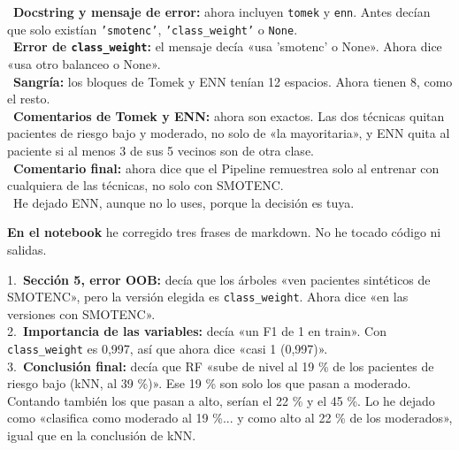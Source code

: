 \documentclass[11pt,a4paper]{article}
\begin{document}
{\hspace*{1.0em}\textbullet~\textbf{Docstring y mensaje de error:} ahora incluyen \texttt{\textquotedbl{}tomek\textquotedbl{}} y \texttt{\textquotedbl{}enn\textquotedbl{}}. Antes decían que solo existían \texttt{'smotenc'}, \texttt{'class\_\allowbreak{}weight'} o \texttt{None}. \\{}
\hspace*{1.0em}\textbullet~\textbf{Error de \texttt{class\_\allowbreak{}weight}:} el mensaje decía «usa 'smotenc' o None». Ahora dice «usa otro balanceo o None». \\{}
\hspace*{1.0em}\textbullet~\textbf{Sangría:} los bloques de Tomek y ENN tenían 12 espacios. Ahora tienen 8, como el resto. \\{}
\hspace*{1.0em}\textbullet~\textbf{Comentarios de Tomek y ENN:} ahora son exactos. Las dos técnicas quitan pacientes de riesgo bajo y moderado, no solo de «la mayoritaria», y ENN quita al paciente si al menos 3 de sus 5 vecinos son de otra clase. \\{}
\hspace*{1.0em}\textbullet~\textbf{Comentario final:} ahora dice que el Pipeline remuestrea solo al entrenar con cualquiera de las técnicas, no solo con SMOTENC. \\{}
\hspace*{1.0em}\textbullet~He dejado ENN, aunque no lo uses, porque la decisión es tuya.

\textbf{En el notebook} he corregido tres frases de markdown. No he tocado código ni salidas.

\hspace*{1.0em}1.~\textbf{Sección 5, error OOB:} decía que los árboles «ven pacientes sintéticos de SMOTENC», pero la versión elegida es \texttt{class\_\allowbreak{}weight}. Ahora dice «en las versiones con SMOTENC». \\{}
\hspace*{1.0em}2.~\textbf{Importancia de las variables:} decía «un F1 de 1 en train». Con \texttt{class\_\allowbreak{}weight} es 0,997, así que ahora dice «casi 1 (0,997)». \\{}
\hspace*{1.0em}3.~\textbf{Conclusión final:} decía que RF «sube de nivel al 19 \% de los pacientes de riesgo bajo (kNN, al 39 \%)». Ese 19 \% son solo los que pasan a moderado. Contando también los que pasan a alto, serían el 22 \% y el 45 \%. Lo he dejado como «clasifica como moderado al 19 \%... y como alto al 22 \% de los moderados», igual que en la conclusión de kNN.

}
\end{document}
